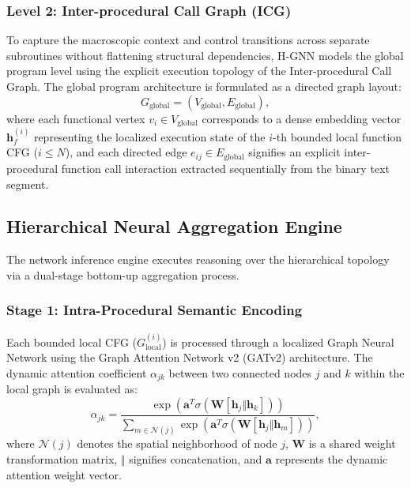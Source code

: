 \documentclass[conference]{IEEEtran}
\begin{document}
\subsubsection{Level 2: Inter-procedural Call Graph (ICG)}
To capture the macroscopic context and control transitions across separate subroutines without flattening structural dependencies, H-GNN models the global program level using the explicit execution topology of the Inter-procedural Call Graph. The global program architecture is formulated as a directed graph layout:
\begin{equation}
G_{\text{global}} = (V_{\text{global}}, E_{\text{global}}),
\end{equation}
where each functional vertex $v_i \in V_{\text{global}}$ corresponds to a dense embedding vector $\mathbf{h}^{(i)}_{f}$ representing the localized execution state of the $i$-th bounded local function CFG ($i \le N$), and each directed edge $e_{ij} \in E_{\text{global}}$ signifies an explicit inter-procedural function call interaction extracted sequentially from the binary text segment.

\subsection{Hierarchical Neural Aggregation Engine}
The network inference engine executes reasoning over the hierarchical topology via a dual-stage bottom-up aggregation process.

\subsubsection{Stage 1: Intra-Procedural Semantic Encoding}
Each bounded local CFG ($G_{\text{local}}^{(i)}$) is processed through a localized Graph Neural Network using the Graph Attention Network v2 (GATv2) architecture. The dynamic attention coefficient $\alpha_{jk}$ between two connected nodes $j$ and $k$ within the local graph is evaluated as:
\begin{equation}
\alpha_{jk} = \frac{\exp\left(\mathbf{a}^{T} \sigma\left(\mathbf{W} [\mathbf{h}_{j} \Vert \mathbf{h}_{k}]\right)\right)}{\sum_{m \in \mathcal{N}(j)} \exp\left(\mathbf{a}^{T} \sigma\left(\mathbf{W} [\mathbf{h}_{j} \Vert \mathbf{h}_{m}]\right)\right)},
\end{equation}
where $\mathcal{N}(j)$ denotes the spatial neighborhood of node $j$, $\mathbf{W}$ is a shared weight transformation matrix, $\Vert$ signifies concatenation, and $\mathbf{a}$ represents the dynamic attention weight vector. 
\end{document}

